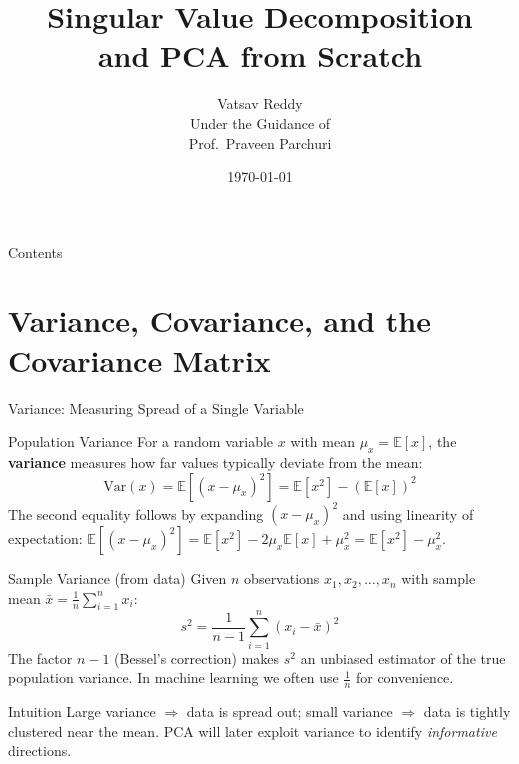 \documentclass{beamer}
\title[SVD \& PCA from Scratch]{%
  Singular Value Decomposition\\[4pt]
  and PCA from Scratch}
\author[Vatsav Reddy]{%
  \texorpdfstring{%
    {\Large Vatsav Reddy}\\[6pt]
    {\small Under the Guidance of}\\[2pt]
    {\small Prof.\ Praveen Parchuri}%
  }{Vatsav Reddy}}
\institute[IIITH]{%
  {\normalsize International Institute of Information Technology, Hyderabad}}
\date{\today}
\begin{document}
\begin{frame}
  \titlepage
\end{frame}

\begin{frame}[shrink=10]{Contents}
  \tableofcontents
\end{frame}


\section{Variance, Covariance, and the Covariance Matrix}

\begin{frame}[shrink=10]{Variance: Measuring Spread of a Single Variable}
  \begin{block}{Population Variance}
    For a random variable $x$ with mean $\mu_x = \mathbb{E}[x]$, the
    \textbf{variance} measures how far values typically deviate from the mean:
    \[
      \mathrm{Var}(x)
        = \mathbb{E}\!\left[(x - \mu_x)^2\right]
        = \mathbb{E}[x^2] - \left(\mathbb{E}[x]\right)^2
    \]
    The second equality follows by expanding $(x-\mu_x)^2$ and using
    linearity of expectation:
    $\mathbb{E}[(x-\mu_x)^2]
    = \mathbb{E}[x^2] - 2\mu_x\mathbb{E}[x] + \mu_x^2
    = \mathbb{E}[x^2] - \mu_x^2$.
  \end{block}

  \medskip

  \begin{block}{Sample Variance (from data)}
    Given $n$ observations $x_1, x_2, \ldots, x_n$ with sample mean
    $\bar{x} = \frac{1}{n}\sum_{i=1}^n x_i$:
    \[
      s^2 = \frac{1}{n-1}\sum_{i=1}^{n}(x_i - \bar{x})^2
    \]
    The factor $n-1$ (Bessel's correction) makes $s^2$ an unbiased
    estimator of the true population variance.
    In machine learning we often use $\frac{1}{n}$ for convenience.
  \end{block}

  \begin{alertblock}{Intuition}
    Large variance $\Rightarrow$ data is spread out; small variance
    $\Rightarrow$ data is tightly clustered near the mean.
    PCA will later exploit variance to identify \emph{informative} directions.
  \end{alertblock}
\end{frame}
\end{document}
